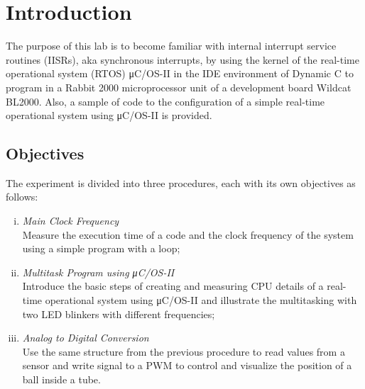 \section{Introduction}

The purpose of this lab is to become familiar with internal interrupt service routines (IISRs), aka synchronous interrupts, by using the kernel of the real-time operational system (RTOS) μC/OS-II in the IDE environment of Dynamic C to program in a Rabbit 2000 microprocessor unit of a development board Wildcat BL2000. Also, a sample of code to the configuration of a simple real-time operational system using μC/OS-II is provided.

\subsection{Objectives}
The experiment is divided into three procedures, each with its own objectives as follows:

\begin{enumerate}[(i)]

\item
\textit{Main Clock Frequency}\\
Measure the execution time of a code and the clock frequency of the system using a simple program with a loop;

\item
\textit{Multitask Program using μC/OS-II}\\
Introduce the basic steps of creating and measuring CPU details of a real-time operational system using μC/OS-II and illustrate the multitasking with two LED blinkers with different frequencies;

\item
\textit{Analog to Digital Conversion}
\\Use the same structure from the previous procedure to read values from a sensor and write signal to a PWM to control and visualize the position of a ball inside a tube.

\end{enumerate}

\begin{lstlisting}[frame=single]
\end{lstlisting}